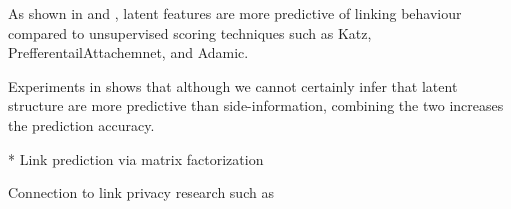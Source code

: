 As shown in \cite{*} and \cite{Zhu2016}, latent features are more predictive of linking behaviour compared to unsupervised scoring techniques such as Katz, PrefferentailAttachemnet, and Adamic.

Experiments in \cite{*} shows that although we cannot certainly infer that latent structure are more predictive than side-information, combining the two increases the prediction accuracy.

* Link prediction via matrix factorization

Connection to link privacy research such as \cite{amin:wwwj}


